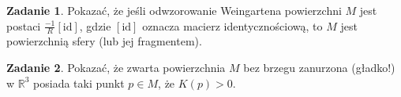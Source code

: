 \documentclass[a4paper,11pt]{article}
\theoremstyle{definition}\newtheorem{exercise}{Zadanie}
\theoremstyle{definition}\newtheorem{remark}{Uwaga}
\begin{document}
\begin{exercise}
Pokazać, że jeśli odwzorowanie Weingartena powierzchni $M$ jest postaci $\frac{-1	}{R}[\text{id}]$, gdzie $[\text{id}]$ oznacza macierz identycznościową, to $M$ jest powierzchnią sfery (lub jej fragmentem).
\end{exercise}

\begin{exercise}
 Pokazać, że zwarta powierzchnia $M$ bez brzegu zanurzona (gładko!) w 
$\mathbb{R}^3$ posiada taki punkt $p\in M$, że $K(p)> 0$.
\end{exercise}
\end{document}
